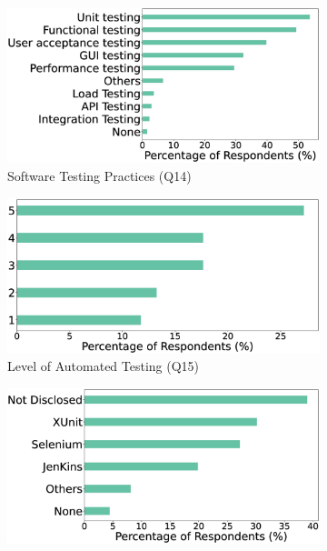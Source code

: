 \begin{figure}[t]
    \centering
    \caption{Software testing and devops practices used by the respondents}
    \begin{subfigure}{0.5\textwidth}
        \includegraphics[scale=0.1]{Figures/Respondents_testing_practices}
        \caption{Software Testing Practices (Q14)}
        \label{fig:testing}
    \end{subfigure}
    \begin{subfigure}{0.4\textwidth}
        \includegraphics[scale=0.09]{Figures/Respondents_autotest_level}
        \caption{Level of Automated Testing (Q15)}
        \label{fig:autoTest}
    \end{subfigure}
    \begin{subfigure}{0.45\textwidth}
        \includegraphics[scale=0.1]{Figures/Respondents_testing_tools}

\end{subfigure}
\end{figure}
